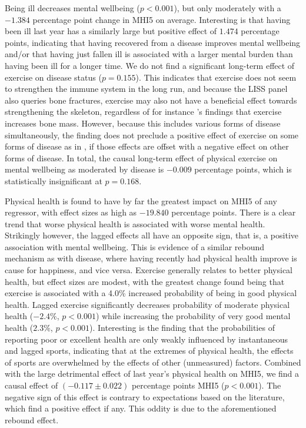Being ill decreases mental wellbeing ($p < 0.001$), but only moderately with a $-1.384$ percentage point change
in MHI5 on average.
Interesting is that having been ill last year has a similarly large but positive effect of $1.474$ percentage points,
indicating that having recovered from a disease improves mental wellbeing and/or that having just fallen ill is associated
with a larger mental burden than having been ill for a longer time.
We do not find a significant long-term effect of exercise on disease status ($p = 0.155$).
This indicates that exercise does not seem to strengthen the immune system in the long run,
and because the LISS panel also queries bone fractures, exercise may also not have a beneficial effect towards
strengthening the skeleton, regardless of for instance 's findings that exercise
increases bone mass.
However, because this includes various forms of disease simultaneously, the finding does not preclude a positive effect of exercise on
some forms of disease as in , if those effects are offset with a negative effect on other forms
of disease.
In total, the causal long-term effect of physical exercise on mental wellbeing as moderated by disease is $-0.009$
percentage points, which is statistically insignificant at $p = 0.168$.

Physical health is found to have by far the greatest impact on MHI5 of any regressor,
with effect sizes as high as $-19.840$ percentage points.
There is a clear trend that worse physical health is associated with worse mental health.
Strikingly however, the lagged effects all have an opposite sign, that is, a positive association with mental wellbeing.
This is evidence of a similar rebound mechanism as with disease, where having recently had physical health improve is
cause for happiness, and vice versa.
Exercise generally relates to better physical health, but effect sizes are modest, with the greatest change found
being that exercise is associated with a 4.0\% increased probability of being in good physical health.
Lagged exercise significantly decreases probability of moderate physical health ($-2.4\%$, $p < 0.001$) while increasing
the probability of very good mental health ($2.3\%$, $p < 0.001$).
Interesting is the finding that the probabilities of reporting poor or excellent health
are only weakly influenced by instantaneous and lagged sports, indicating that at the extremes of physical health,
the effects of sports are overwhelmed by the effects of other (unmeasured) factors.
Combined with the large detrimental effect of last year's physical health on MHI5, we find a causal effect
of $(-0.117 \pm 0.022)$ percentage points MHI5 ($p < 0.001$). The negative sign of this effect is contrary to expectations based on the
literature, which find a positive effect if any. This oddity is due to the aforementioned rebound effect.

